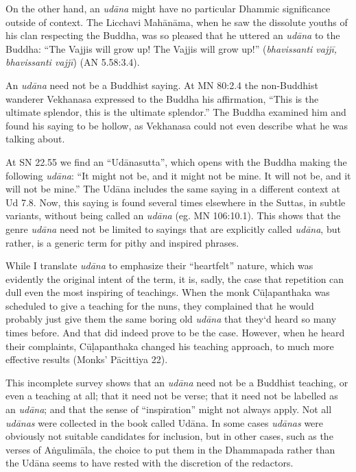 \documentclass[12pt,openany]{book}%
\begin{document}
On the other hand, an \textit{\textsanskrit{udāna}} might have no particular Dhammic significance outside of context. The Licchavi \textsanskrit{Mahānāma}, when he saw the dissolute youths of his clan respecting the Buddha, was so pleased that he uttered an \textit{\textsanskrit{udāna}} to the Buddha: “The Vajjis will grow up! The Vajjis will grow up!” (\textit{bhavissanti \textsanskrit{vajjī}, bhavissanti \textsanskrit{vajjī}}) (AN 5.58:3.4).

An \textit{\textsanskrit{udāna}} need not be a Buddhist saying. At MN 80:2.4 the non-Buddhist wanderer Vekhanasa expressed to the Buddha his affirmation, “This is the ultimate splendor, this is the ultimate splendor.” The Buddha examined him and found his saying to be hollow, as Vekhanasa could not even describe what he was talking about.

At SN 22.55  we find an “\textsanskrit{Udānasutta}”, which opens with the Buddha making the following \textit{\textsanskrit{udāna}}: “It might not be, and it might not be mine. It will not be, and it will not be mine.” The \textsanskrit{Udāna} includes the same saying in a different context at Ud 7.8. Now, this saying is found several times elsewhere in the Suttas, in subtle variants, without being called an \textit{\textsanskrit{udāna}} (eg. MN 106:10.1). This shows that the genre \textit{\textsanskrit{udāna}} need not be limited to sayings that are explicitly called \textit{\textsanskrit{udāna}}, but rather, is a generic term for pithy and inspired phrases. 

While I translate \textit{\textsanskrit{udāna}} to emphasize their “heartfelt” nature, which was evidently the original intent of the term, it is, sadly, the case that repetition can dull even the most inspiring of teachings. When the monk \textsanskrit{Cūḷapanthaka} was scheduled to give a teaching for the nuns, they complained that he would probably just give them the same boring old \textit{\textsanskrit{udāna}} that they‘d heard so many times before. And that did indeed prove to be the case. However, when he heard their complaints, \textsanskrit{Cūḷapanthaka} changed his teaching approach, to much more effective results (Monks’ \textsanskrit{Pācittiya} 22). 

This incomplete survey shows that an \textit{\textsanskrit{udāna}} need not be a Buddhist teaching, or even a teaching at all; that it need not be verse; that it need not be labelled as an \textit{\textsanskrit{udāna}}; and that the sense of “inspiration” might not always apply. Not all \textit{\textsanskrit{udānas}} were collected in the book called \textsanskrit{Udāna}. In some cases \textit{\textsanskrit{udānas}} were obviously not suitable candidates for inclusion, but in other cases, such as the verses of \textsanskrit{Aṅgulimāla}, the choice to put them in the Dhammapada rather than the \textsanskrit{Udāna} seems to have rested with the discretion of the redactors. 
\end{document}
